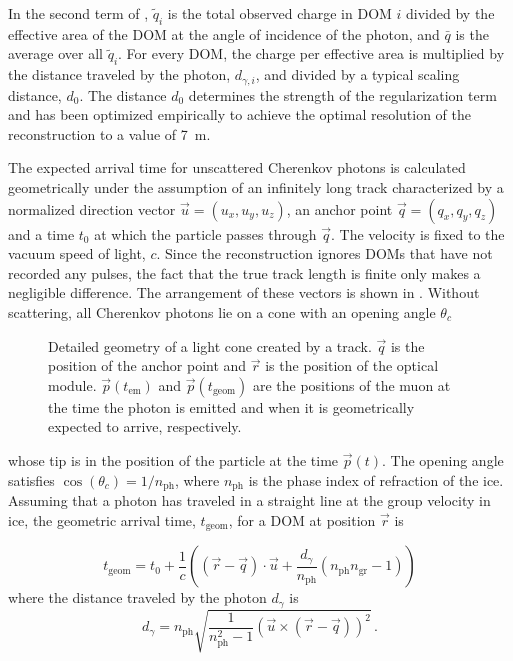 In the second term of , $\tilde{q}_i$ is the total observed charge in DOM $i$ divided by the effective area of the DOM at the angle of incidence of the photon, and $\bar{q}$ is the average over all $\tilde{q}_i$.
For every DOM, the charge per effective area is multiplied by the distance traveled by the photon, $d_{\gamma,i}$, and divided by a typical scaling distance, $d_0$.
The distance $d_0$ determines the strength of the regularization term and has been optimized empirically to achieve the optimal resolution of the reconstruction to a value of \SI{7}{\meter}.

The expected arrival time for unscattered Cherenkov photons is calculated geometrically under the assumption of an infinitely long track characterized by a normalized direction vector $\vec{u}=(u_{x},u_{y},u_{z})$,
an anchor point $\vec{q}=(q_{x},q_{y},q_{z})$ and a time $t_{0}$
at which the particle passes through $\vec{q}$.
The
velocity is fixed to the vacuum speed of light, $c$.
Since the reconstruction ignores DOMs that have not recorded any pulses, the fact that the true track length is finite only makes a negligible  difference.
The arrangement of these vectors is shown in .
Without scattering, all Cherenkov photons lie on a cone with an opening
angle $\theta_{c}$
\begin{figure}[h]
\begin{centering}
\par
\end{centering}
\caption{\label{fig:Detailed-track-geometry}Detailed geometry of a light cone
created by a track.
$\vec{q}$ is the position of the anchor point
and $\vec{r}$ is the position of the optical module. $\vec{p}(t_{\mathrm{em}})$
and $\vec{p}(t_{\mathrm{geom}})$ are the positions of the muon at
the time the photon is emitted and when it is geometrically expected
to arrive, respectively.}
\end{figure}
whose tip is in the position of the particle at the time $\vec{p}(t)$. The opening angle satisfies $\cos(\theta_c)=1/n_{\mathrm{ph}}$, where $n_{\mathrm{ph}}$ is the phase index of refraction of the ice.
Assuming that a photon has traveled in a straight line at the group velocity in ice, the geometric arrival time, $t_{\mathrm{geom}}$, for a DOM at position $\vec{r}$ is

\begin{equation}
t_{\mathrm{geom}}=t_{0}+\frac{1}{c}\left(\left(\vec{r}-\vec{q}\right)\cdot\vec{u}+\frac{d_{\gamma}}{n_{\mathrm{ph}}}\left(n_{\mathrm{ph}}n_{\mathrm{gr}}-1\right)\right)\label{eq:t_geom-MS-track}
\end{equation}
where the distance traveled by the photon $d_\gamma$ is
\begin{equation}
d_{\gamma}=n_{\mathrm{ph}}\sqrt{\frac{1}{n_{\mathrm{ph}}^{2}-1}\left(\vec{u}\times\left(\vec{r}-\vec{q}\right)\right)^{2}}\,.\label{eq:photon-distance-3d}
\end{equation}

